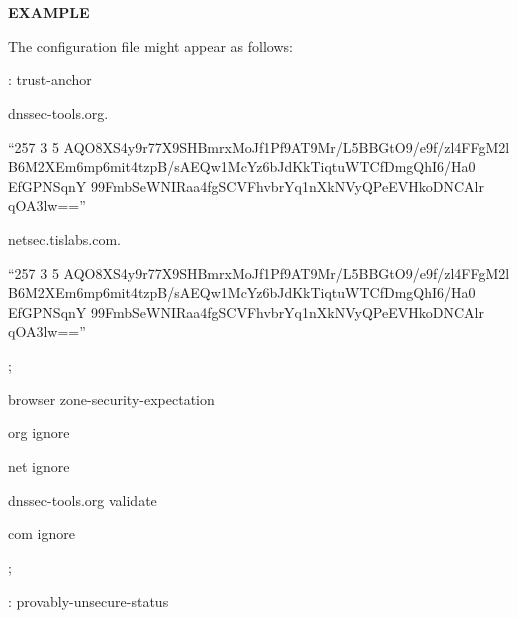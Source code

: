 {\bf EXAMPLE}

The  configuration file might appear as follows:

\begin{description}

\item : trust-anchor\verb" "

\begin{description}

\item dnssec-tools.org.\verb" "

\begin{description}
\item ``257 3 5 AQO8XS4y9r77X9SHBmrxMoJf1Pf9AT9Mr/L5BBGtO9/e9f/zl4FFgM2l B6M2XEm6mp6mit4tzpB/sAEQw1McYz6bJdKkTiqtuWTCfDmgQhI6/Ha0 EfGPNSqnY 99FmbSeWNIRaa4fgSCVFhvbrYq1nXkNVyQPeEVHkoDNCAlr qOA3lw==''\verb" "
\end{description}

\item netsec.tislabs.com.\verb" "

\begin{description}
\item ``257 3 5 AQO8XS4y9r77X9SHBmrxMoJf1Pf9AT9Mr/L5BBGtO9/e9f/zl4FFgM2l B6M2XEm6mp6mit4tzpB/sAEQw1McYz6bJdKkTiqtuWTCfDmgQhI6/Ha0 EfGPNSqnY 99FmbSeWNIRaa4fgSCVFhvbrYq1nXkNVyQPeEVHkoDNCAlr qOA3lw=='' \verb" "
\end{description}

\item ;\verb" "

\end{description}

\item browser zone-security-expectation    \verb" "

\begin{description}

\item org ignore \verb" "

\item net ignore\verb" "

\item dnssec-tools.org validate\verb" "

\item com ignore\verb" "

\item ;\verb" "

\end{description}

\item : provably-unsecure-status \verb" "


\end{description}
